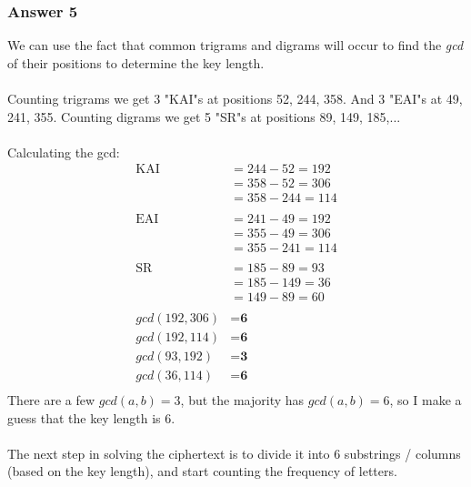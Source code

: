 \documentclass{article}
\begin{document}
	\subsubsection*{Answer 5}
	We can use the fact that common trigrams and digrams will occur to find the \textit{gcd} of their positions to determine the key length.
	\\\\	
	Counting trigrams we get 3 "KAI"s at positions 52, 244, 358. And 3 "EAI"s at 49, 241, 355. Counting digrams we get 5 "SR"s at positions 89, 149, 185,...
	\\\\
	Calculating the gcd:
	\[
	\begin{split}
	\text{KAI } &= 244-52=192 \\
	&=358-52=306 \\
	&=358-244=114\\
	\\
	\text{EAI }&= 241-49=192\\
	&=355-49=306\\
	&=355-241=114\\
	\\
	\text{SR }&=185-89=93\\
	&=185-149=36\\
	&=149-89=60\\
	\\
	gcd(192,306)&=\textbf{6}\\
	gcd(192,114)&=\textbf{6}\\
	gcd(93,192)&=\textbf{3}\\
	gcd(36,114)&=\textbf{6}\\
	\end{split}
	\]
	There are a few $gcd(a,b)=3$, but the majority has $gcd(a,b)=6$, so I make a guess that the key length is 6.
	\\\\
	The next step in solving the ciphertext is to divide it into 6 substrings / columns (based on the key length), and start counting the frequency of letters. 
\end{document}
